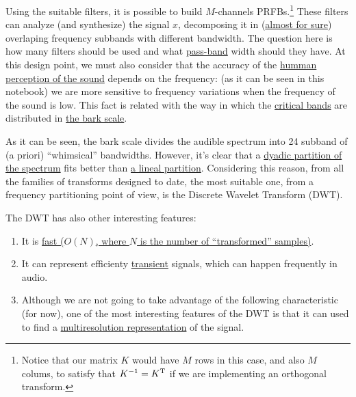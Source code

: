 Using the suitable filters, it is possible to build $M$-channels
PRFBs.\footnote{Notice that our matrix $K$ would have $M$ rows in this
  case, and also $M$ colums, to satisfy that $K^{-1}=K^{\text T}$ if
  we are implementing an orthogonal transform.}  These filters can
analyze (and synthesize) the signal $x$, decomposing it in
(\href{https://en.wikipedia.org/wiki/Low-pass_filter#Ideal_and_real_filters}{almost
  for sure}) overlaping frequency subbands with different
bandwidth. The question here is how many filters should be used and
what \href{https://en.wikipedia.org/wiki/Band-pass_filter}{pass-band}
width should they have. At this design point, we must also consider
that the accuracy of the
\href{https://en.wikipedia.org/wiki/Psychoacoustics}{humman perception
  of the sound} depends on the frequency: (as it can be seen in this
notebook) we are more sensitive to frequency variations when the
frequency of the sound is low. This fact is related with the way in
which the \href{https://en.wikipedia.org/wiki/Critical_band}{critical
  bands} are distributed in
\href{https://en.wikipedia.org/wiki/Bark_scale}{the bark scale}.

As it can be seen, the bark scale divides the audible spectrum into 24
subband of (a priori) ``whimsical'' bandwidths. However, it's clear
that a \href{https://en.wikipedia.org/wiki/Octave_band}{dyadic
  partition of the spectrum} fits better than
\href{https://en.wikipedia.org/wiki/Wavelet_transform#Principle}{a
  lineal partition}. Considering this reason, from all the families of
transforms designed to date, the most suitable one, from a frequency
partitioning point of view, is the Discrete Wavelet Transform (DWT).

The DWT has also other interesting features:
\begin{enumerate}
\item It is
  \href{https://en.wikipedia.org/wiki/Discrete_wavelet_transform#Time_complexity}{fast
    ($O(N)$, where $N$ is the number of ``transformed'' samples)}.
\item It can represent efficienty
  \href{https://en.wikipedia.org/wiki/Transient_(oscillation)}{transient}
  signals, which can happen frequently in audio.
\item Although we are not going to take advantage of the following
  characteristic (for now), one of the most interesting features of
  the DWT is that it can used to find a
  \href{https://en.wikipedia.org/wiki/Multiresolution_analysis}{multiresolution
    representation} of the signal.
\end{enumerate}

